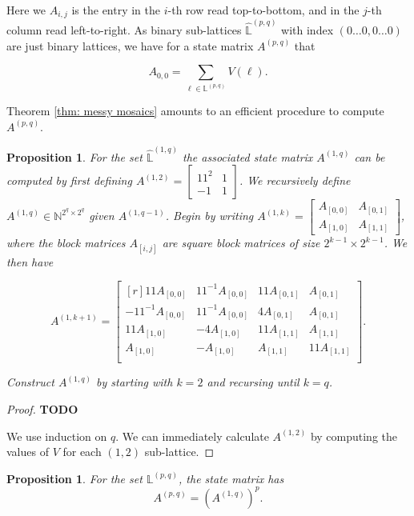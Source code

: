 \documentclass[12pt]{article}
\theoremstyle{plain}
\newtheorem{prop}[thm]{Proposition}
\theoremstyle{definition}
\theoremstyle{remark}
\theoremstyle{definition}
\begin{document}
Here we $A_{i,j}$ is the entry in the $i$-th row read top-to-bottom, and in the $j$-th column read left-to-right. As binary sub-lattices $\hat{\mathbb{L}}^{(p,q)}$ with index $(0\dots0,0\dots0)$ are just binary lattices, we have for a state matrix $A^{(p,q)}$ that 

$$A_{0,0} = \sum_{\ell \in \mathbb{L}^{(p,q)}}V(\ell).$$

Theorem \ref{thm: messy mosaics} amounts to an efficient procedure to compute $A^{(p,q)}$.

\begin{prop}
For the set $\hat{\mathbb{L}}^{(1,q)}$ the associated state matrix $A^{(1,q)}$ can be computed by first defining $A^{(1,2)} = \begin{bmatrix}
11^2 & 1 \\
-1 & 1
\end{bmatrix}$. We recursively define $A^{(1,q)} \in \mathbb{N}^{2^{q} \times 2^{q}}$ given $A^{(1,q-1)}$. Begin by writing
$
A^{(1,k)} = \begin{bmatrix}
A_{[0,0]} & A_{[0,1]} \\
A_{[1,0]} & A_{[1,1]}
\end{bmatrix}
$, where the block matrices $A_{[i,j]}$ are square block matrices of size $2^{k-1} \times 2^{k-1}$. We then have

$$
A^{(1,k+1)} = \begin{bmatrix*}[r]
    11A_{[0,0]} & 11^{-1}A_{[0,0]} & 11A_{[0,1]} & A_{[0,1]} \\
    -11^{-1}A_{[0,0]} & 11^{-1}A_{[0,0]} & 4A_{[0,1]} & A_{[0,1]} \\
    11A_{[1,0]} & -4A_{[1,0]} & 11A_{[1,1]}  & A_{[1,1]} \\
    A_{[1,0]} & -A_{[1,0]} & A_{[1,1]} & 11A_{[1,1]} \\
\end{bmatrix*}.
$$

Construct $A^{(1,q)}$ by starting with $k=2$ and recursing until $k=q$. 

\end{prop}

\begin{proof}
    \textbf{TODO}

    We use induction on $q$. We can immediately calculate $A^{(1,2)}$ by computing the values of $V$ for each $(1,2)$ sub-lattice. 
\end{proof}

\begin{prop}
    For the set $\mathbb{L}^{(p,q)}$, the state matrix has
    $$A^{(p,q)} = (A^{(1,q)})^p.$$
\end{prop}
\end{document}
